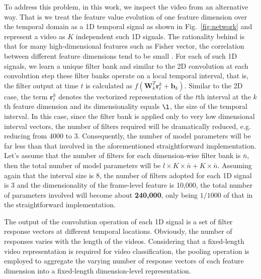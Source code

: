 \documentclass[journal]{IEEEtran}
\begin{document}
To address this problem, in this work, we inspect the video from an alternative way. That is we treat the feature value evolution of one feature dimension over the temporal domain as a 1D temporal signal as shown in Fig.~\ref{fig:network} and represent a video as $K$ independent such 1D signals. The rationality behind is that for many high-dimensional features such as Fisher vector, the correlation between different feature dimensions tend to be small \cite{Zhang_2014_CVPR}. For each of such 1D signals, we learn a unique filter bank and similar to the 2D convolution at each convolution step these filter banks operate on a local temporal interval, that is, the filter output at time $t$ is calculated as $f(\mathbf{W}_{k}^T \mathbf{r}^{k}_{t}+\mathbf{b}_k)$. Similar to the 2D case, the term $\mathbf{r}^{k}_{t}$ denotes the vectorized representation of the $t$th interval at the $k$th feature dimension and its dimensionality equals $\l$, the size of the temporal interval.
In this case, since the filter bank is applied only to very low dimensional interval vectors, the number of filters required will be dramatically reduced,  e.g. reducing from 4000 to 3. Consequently, the number of model parameters will be far less than that involved in the aforementioned straightforward implementation. Let's assume that the number of filters for each dimension-wise filter bank is $\bar{n}$, then the total number of model parameters will be $l \times K \times \bar{n} +  K \times \bar{n}$. Assuming again that the interval size is 8, the number of filters adopted for each 1D signal is 3 and the dimensionality of the frame-level feature is 10,000, the total number of parameters involved will become about \textbf{240,000}, only being $1/1000$ of that in the straightforward implementation.









The output of the convolution operation of each 1D signal is a set of filter response vectors at different temporal locations. Obviously, the number of responses varies with the length of the videos. Considering that a fixed-length video representation is required for video classification, the pooling operation is employed to aggregate the varying number of response vectors of each feature dimension into a fixed-length dimension-level representation.
\end{document}
